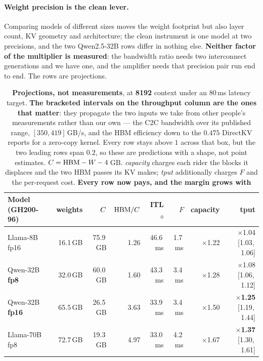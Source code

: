\paragraph{Weight precision is the clean lever.} Comparing models of different
sizes moves the weight footprint but also layer count, KV geometry and
architecture; the clean instrument is one model at two precisions, and the two
Qwen2.5-32B rows differ in nothing else. \textbf{Neither factor of the multiplier
is measured}: the bandwidth ratio needs two interconnect generations and we have
one, and the amplifier needs that precision pair run end to end. The rows are
projections.

\begin{table}[t]
\centering
\small
\begin{tabular}{lrrrrrrr}
\toprule
Model (GH200-96) & weights & $C$ & $\mathrm{HBM}/C$ & ITL$_0$ & $F$ & capacity & tput \\
\midrule
Llama-8B fp16          & 16.1\,GB & 75.9\,GB & 1.26 & 46.6\,ms & \phantom{0}1.7\,ms & $\times$1.22 & $\times$1.04 \footnotesize[1.03,\,1.06] \\
Qwen-32B \textbf{fp8}  & 32.0\,GB & 60.0\,GB & 1.60 & 43.3\,ms & \phantom{0}3.4\,ms & $\times$1.28 & $\times$1.08 \footnotesize[1.06,\,1.12] \\
Qwen-32B \textbf{fp16} & 65.5\,GB & 26.5\,GB & 3.63 & 33.9\,ms & \phantom{0}3.4\,ms & $\times$1.50 & $\times$\textbf{1.25} \footnotesize[1.19,\,1.44] \\
Llama-70B fp8          & 72.7\,GB & 19.3\,GB & 4.97 & 33.0\,ms & \phantom{0}4.2\,ms & $\times$1.67 & $\times$\textbf{1.37} \footnotesize[1.30,\,1.61] \\
\bottomrule
\end{tabular}
\caption{\textbf{Projections, not measurements}, at \textbf{8192} context under an
$80$\,ms latency target. \textbf{The bracketed intervals on the throughput column
are the ones that matter}: they propagate the two inputs we take from other
people's measurements rather than our own --- the C2C bandwidth over its published
range, $[350, 419]$\,GB/s, and the HBM efficiency down to the $0.475$ DirectKV
reports for a zero-copy kernel. Every row stays above $1$ across that box, but the
two leading rows span $0.2$, so these are predictions with a shape, not point
estimates.
$C = \mathrm{HBM} - W - 4$\,GB. \emph{capacity} charges each rider the blocks it
displaces and the two HBM passes its KV makes; \emph{tput} additionally charges $F$
and the per-request cost. \textbf{Every row now pays, and the margin grows with
}}
\end{table}
